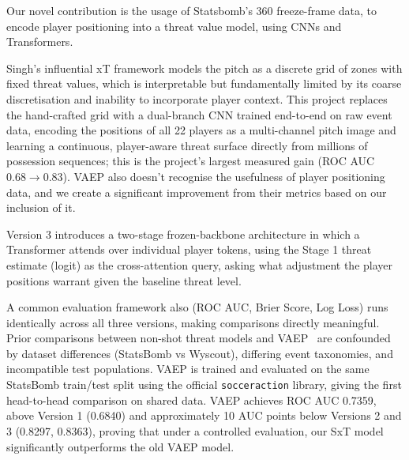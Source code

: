 Our novel contribution is the usage of Statsbomb's 360 freeze-frame data, to encode player positioning into a threat value model, using CNNs and Transformers.

Singh's influential xT framework \cite{singh2019} models the pitch as a discrete grid of zones with fixed threat values, which is interpretable but fundamentally limited by its coarse discretisation and inability to incorporate player context. This project replaces the hand-crafted grid with a dual-branch CNN trained end-to-end on raw event data, encoding the positions of all 22 players as a multi-channel pitch image \cite{statsbomb360} and learning a continuous, player-aware threat surface directly from millions of possession sequences; this is the project's largest measured gain (ROC AUC $0.68 \to 0.83$). VAEP \cite{decroos2019} also doesn't recognise the usefulness of player positioning data, and we create a significant improvement from their metrics based on our inclusion of it. 

Version 3 introduces a two-stage frozen-backbone architecture in which a Transformer \cite{vaswani2017} attends over individual player tokens, using the Stage 1 threat estimate (logit) as the cross-attention query, asking what adjustment the player positions warrant given the baseline threat level. 

 A common evaluation framework also (ROC AUC, Brier Score, Log Loss) runs identically across all three versions, making comparisons directly meaningful. Prior comparisons between non-shot threat models and VAEP~\cite{decroos2019} are confounded by dataset differences (StatsBomb vs Wyscout), differing event taxonomies, and incompatible test populations. VAEP is trained and evaluated on the same StatsBomb train/test split using the official \texttt{socceraction} library, giving the first head-to-head comparison on shared data. VAEP achieves ROC AUC 0.7359, above Version 1 (0.6840) and approximately 10 AUC points below Versions 2 and 3 (0.8297, 0.8363), proving that under a controlled evaluation, our SxT model significantly outperforms the old VAEP model.

